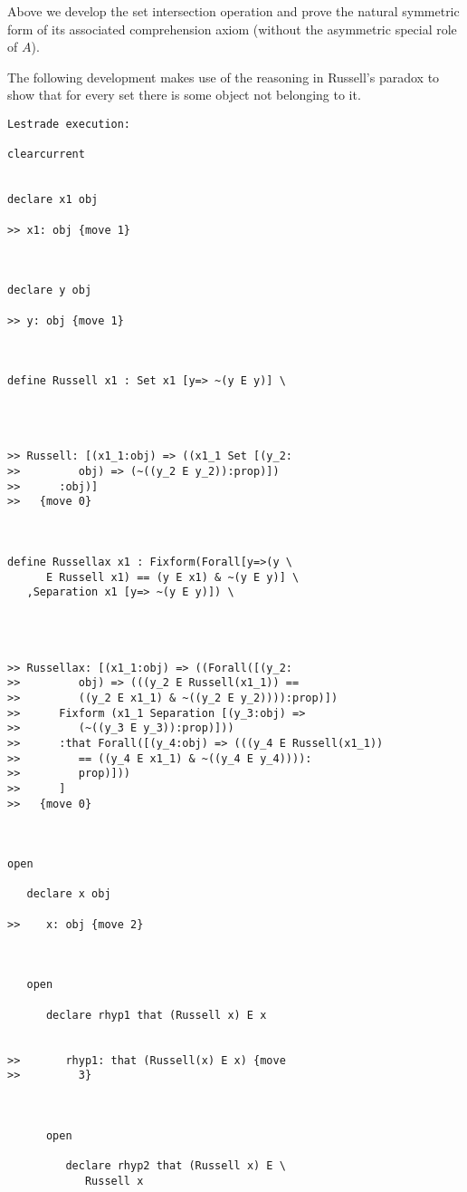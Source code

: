 \documentclass[12pt]{article}
\begin{document}
Above we develop the set intersection operation and prove the natural symmetric form of its associated comprehension axiom (without the asymmetric special role of $A$).


The following development makes use of the reasoning in Russell's paradox to show that for every set there is some object not belonging to it.

\begin{verbatim}Lestrade execution:

clearcurrent


declare x1 obj

>> x1: obj {move 1}



declare y obj

>> y: obj {move 1}



define Russell x1 : Set x1 [y=> ~(y E y)] \
   



>> Russell: [(x1_1:obj) => ((x1_1 Set [(y_2:
>>         obj) => (~((y_2 E y_2)):prop)])
>>      :obj)]
>>   {move 0}



define Russellax x1 : Fixform(Forall[y=>(y \
      E Russell x1) == (y E x1) & ~(y E y)] \
   ,Separation x1 [y=> ~(y E y)]) \
   



>> Russellax: [(x1_1:obj) => ((Forall([(y_2:
>>         obj) => (((y_2 E Russell(x1_1)) ==
>>         ((y_2 E x1_1) & ~((y_2 E y_2)))):prop)])
>>      Fixform (x1_1 Separation [(y_3:obj) =>
>>         (~((y_3 E y_3)):prop)]))
>>      :that Forall([(y_4:obj) => (((y_4 E Russell(x1_1))
>>         == ((y_4 E x1_1) & ~((y_4 E y_4)))):
>>         prop)]))
>>      ]
>>   {move 0}



open

   declare x obj

>>    x: obj {move 2}



   open

      declare rhyp1 that (Russell x) E x


>>       rhyp1: that (Russell(x) E x) {move
>>         3}



      open

         declare rhyp2 that (Russell x) E \
            Russell x


\end{verbatim}
\end{document}
